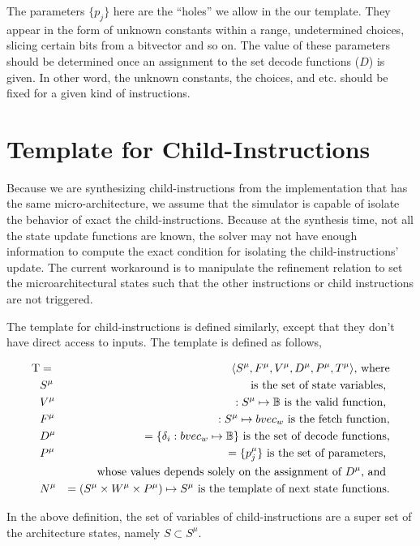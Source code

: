 \documentclass[letterpaper, 11 pt]{article}
\begin{document}
%

The parameters $\{ p_j \}$ here are the ``holes'' we allow in the our template. They appear in the form of unknown constants within a range, undetermined choices, slicing certain bits from a bitvector and so on. The value of these parameters should be determined once an assignment to the set decode functions ($D$) is given. In other word, the unknown constants, the choices, and etc. should be fixed for a given kind of instructions.

\section{Template for Child-Instructions}

Because we are synthesizing child-instructions from the implementation that has the same micro-architecture, we assume that the simulator is capable of isolate the behavior of exact the child-instructions. Because at the synthesis time, not all the state update functions are known, the solver may not have enough information to compute the exact condition for isolating the child-instructions' update. The current workaround is to manipulate the refinement relation to set the microarchitectural states such that the other instructions or child instructions are not triggered.

The template for child-instructions is defined similarly, except that they don't have direct access to inputs. The template is defined as follows,

\begin{eqnarray}
  \mathrm{T} &=& \langle S^{\mu}, F^{\mu}, V^{\mu}, D^{\mu}, P^{\mu}, T^{\mu}\rangle \text{, where} \nonumber \\
      &S^{\mu}& \text{ is the set of state variables, } \nonumber \\
      &V^{\mu}& :S^{\mu} \mapsto \mathbb{B} \text{ is the valid function, } \nonumber \\
      &F^{\mu}& :S^{\mu} \mapsto bvec_w \text{ is the fetch function,} \nonumber \\
      &D^{\mu}& = \{ \delta_i : bvec_w \mapsto \mathbb{B} \} 
            \text{ is the set of decode functions,} \nonumber \\
      &P^{\mu}& = \{ p_j^{\mu} \} \text{ is the set of parameters, } \nonumber \\
            & &\text{whose values depends solely on the assignment of $D^{\mu}$, and } \nonumber \\
      &N^{\mu}& = (S^{\mu} \times W^{\mu} \times P^{\mu}) \mapsto S^{\mu} 
            \text{ is the template of next state functions.} \nonumber
\end{eqnarray}

In the above definition, the set of variables of child-instructions are a super set of the architecture states, namely $S \subset S^{\mu}$. 


%
%
\end{document}
